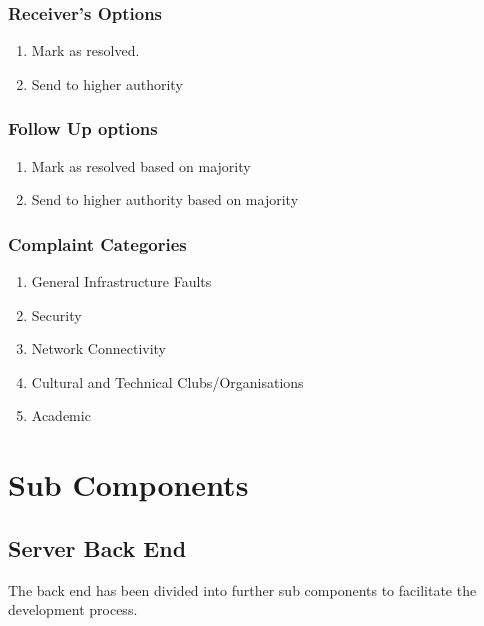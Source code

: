 \documentclass{article}
\begin{document}
			\subsubsection{Receiver's Options}
				\begin{enumerate}
					\item Mark as resolved.
					\item Send to higher authority
				\end{enumerate}
			\subsubsection{Follow Up options}
				\begin{enumerate}
					\item Mark as resolved based on majority
					\item Send to higher authority based on majority
				\end{enumerate}
			\subsubsection{Complaint Categories}
				\begin{enumerate}
					\item General Infrastructure Faults
					\item Security
					\item Network Connectivity
					\item Cultural and Technical Clubs/Organisations
					\item Academic
				\end{enumerate}
	\section{Sub Components}
			\subsection{Server Back End}
				The back end has been divided into further sub components to facilitate the development process.
\end{document}
